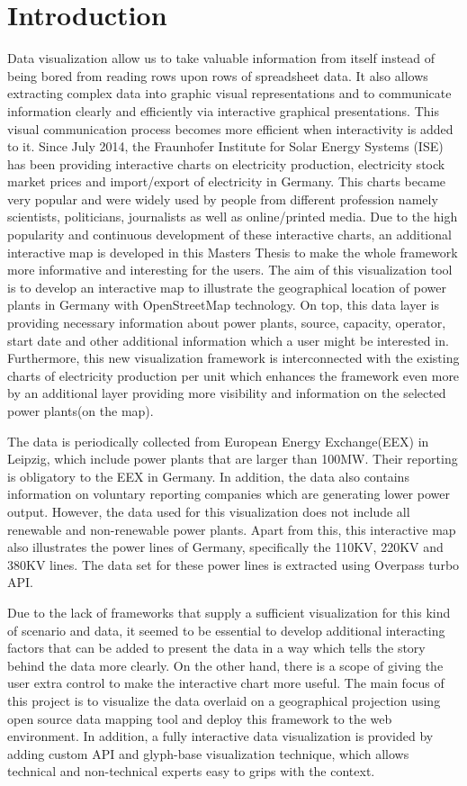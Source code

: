 \chapter{Introduction}

Data visualization allow us to take valuable information from itself instead of being bored from reading rows upon rows of spreadsheet data. It also allows extracting complex data into graphic visual representations and to communicate information clearly and efficiently via interactive graphical presentations. This visual communication process becomes more efficient when interactivity is added to it. Since July 2014, the Fraunhofer Institute for Solar Energy Systems (ISE) has been providing interactive charts on electricity production, electricity stock market prices and import/export of electricity in Germany. This charts became very popular and were widely used by people from different profession namely scientists, politicians, journalists as well as online/printed media. Due to the high popularity and continuous development of these interactive charts, an additional interactive map is developed in this Masters Thesis to make the whole framework more informative and interesting for the users. The aim of this visualization tool is to develop an interactive map to illustrate the geographical location of power plants in Germany with OpenStreetMap technology. On top, this data layer is providing necessary information about power plants, source, capacity, operator, start date and other additional information which a user might be interested in. Furthermore, this new visualization framework is interconnected with the existing charts of electricity production per unit which enhances the framework even more by an additional layer providing more visibility and information on the selected power plants(on the map).

The data is periodically collected from European Energy Exchange(EEX) in Leipzig, which include power plants that are larger than 100MW. Their reporting is obligatory to the EEX in Germany. In addition, the data also contains information on voluntary reporting companies which are generating lower power output. However, the data used for this visualization does not include all renewable and non-renewable power plants. Apart from this, this interactive map also illustrates the power lines of Germany, specifically the 110KV, 220KV and 380KV lines. The data set for these power lines is extracted using Overpass turbo API. 

Due to the lack of frameworks that supply a sufficient visualization for this kind of scenario and data, it seemed to be essential to develop additional interacting factors that can be added to present the data in a way which tells the story behind the data more clearly. On the other hand, there is a scope of giving the user extra control to make the interactive chart more useful. The main focus of this project is to visualize the data overlaid on a geographical projection using open source data mapping tool and deploy this framework to the web environment. In addition, a fully interactive data visualization is provided by adding custom API and glyph-base visualization technique, which allows technical and non-technical experts easy to grips with the context.
 
